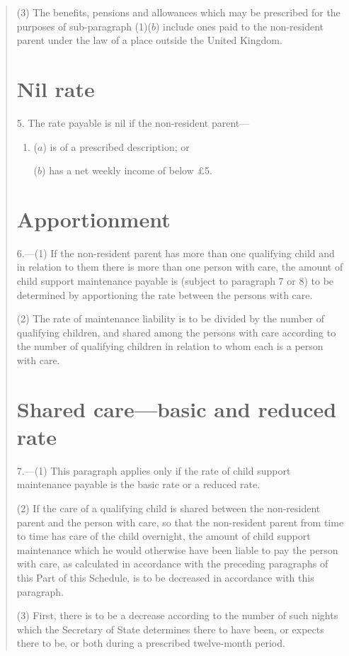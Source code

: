 \documentclass[12pt,a4paper]{article}
\begin{document}
\begin{quotation}
(3) The benefits, pensions and allowances which may be prescribed for the purposes of sub-paragraph (1)($b$)  include ones paid to the non-resident parent under the law of a place outside the United Kingdom.

\section*{Nil rate}

5. The rate payable is nil if the non-resident parent—
\begin{enumerate}\item[]
($a$) is of a prescribed description; or

($b$) has a net weekly income of below £5. 
\end{enumerate}

\section*{Apportionment}

6.---(1) If the non-resident parent has more than one qualifying child and in relation to them there is more than one person with care, the amount of child support maintenance payable is (subject to paragraph 7 or 8) to be determined by apportioning the rate between the persons with care.

(2) The rate of maintenance liability is to be divided by the number of qualifying children, and shared among the persons with care according to the number of qualifying children in relation to whom each is a person with care.

\section*{Shared care—basic and reduced rate}

7.---(1) This paragraph applies only if the rate of child support maintenance payable is the basic rate or a reduced rate.

(2) If the care of a qualifying child is shared between the non-resident parent and the person with care, so that the non-resident parent from time to time has care of the child overnight, the amount of child support maintenance which he would otherwise have been liable to pay the person with care, as calculated in accordance with the preceding paragraphs of this Part of this Schedule, is to be decreased in accordance with this paragraph.

(3) First, there is to be a decrease according to the number of such nights which the Secretary of State determines there to have been, or expects there to be, or both during a prescribed twelve-month period.


\end{quotation}
\end{document}
